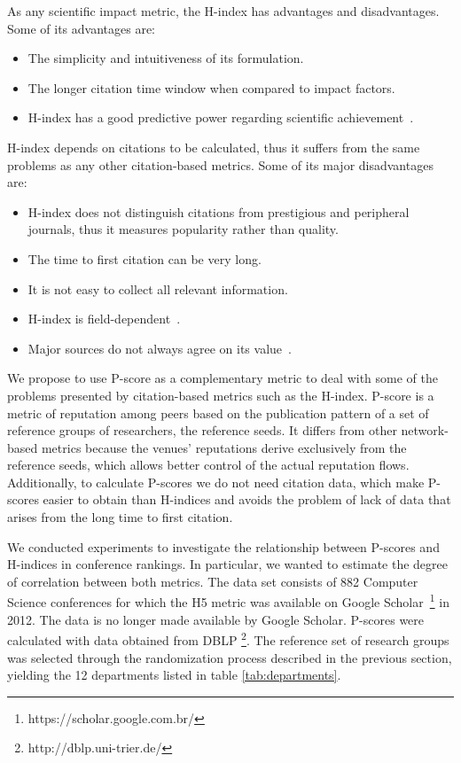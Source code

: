 \documentclass[man]{apa6}
\begin{document}
As any scientific impact metric, the H-index has advantages and disadvantages. 
Some of its advantages are:

\begin{itemize}
\item The simplicity and intuitiveness of its formulation.
\item The longer citation time window when compared to impact factors.
\item H-index has a good predictive power regarding scientific achievement~\cite{Bornmann2005, Hirsch2007}.
\end{itemize}

H-index depends on citations to be calculated, thus it suffers from the 
same problems as any other citation-based metrics. Some of its major disadvantages are:

\begin{itemize}
\item H-index does not distinguish citations from prestigious and peripheral journals, thus 
it measures popularity rather than quality.
\item The time to first citation can be very long.
\item It is not easy to collect all relevant information.
\item H-index is field-dependent~\cite{Wendl2007}.
\item Major sources do not always agree on its value~\cite{Bar-Ilan2008}. 
\end{itemize}

We propose to use P-score as a complementary metric to deal with some of the problems
presented by citation-based metrics such as the H-index.
P-score is a metric of reputation among peers based on the publication pattern of a set of
reference groups of researchers, the reference seeds. It differs from other network-based 
metrics because the venues' reputations derive exclusively from the reference seeds, which 
allows better control of the actual reputation flows. Additionally, to calculate P-scores we 
do not need citation data, which make P-scores easier to obtain than H-indices and avoids 
the problem of lack of data that arises from the long time to first citation.

We conducted experiments to investigate the relationship between P-scores and H-indices
in conference rankings. In particular, we wanted to estimate the degree of correlation between both metrics. The data set consists of 882 Computer Science conferences
for which the H5 metric was available on Google Scholar~\footnote{https://scholar.google.com.br/}
in 2012. The data is no longer made available by Google Scholar. P-scores were calculated with
data obtained from DBLP \footnote{http://dblp.uni-trier.de/}. The reference set of research groups
was selected through the randomization process described in the previous section, 
yielding the 12 departments listed in table \ref{tab:departments}.
\end{document}
